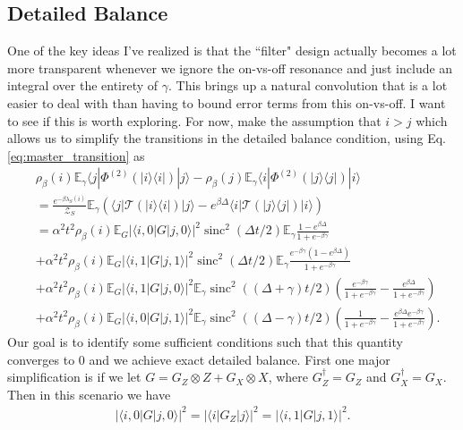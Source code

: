 \documentclass[
 amsmath,amssymb,
 aps,
onecolumn, 
nofootinbib]{revtex4-2}
\newcommand{\ket}[1]{|#1\rangle}
\newcommand{\bra}[1]{\langle #1|}
\newcommand{\ketbra}[2]{| #1\rangle\! \langle #2|}
\newcommand{\abs}[1]{\left| #1 \right|}
\newcommand{\EE}{\mathbb{E}}
\newcommand{\tp}{\otimes}
\newcommand{\partfun}{\mathcal{Z}}
\DeclareMathOperator{\sinc}{sinc}
\begin{document}
\subsection{Detailed Balance}
One of the key ideas I've realized is that the ``filter" design actually becomes a lot more transparent whenever we ignore the on-vs-off resonance and just include an integral over the entirety of $\gamma$. This brings up a natural convolution that is a lot easier to deal with than having to bound error terms from this on-vs-off. I want to see if this is worth exploring. For now, make the assumption that $i > j$ which allows us to simplify the transitions in the detailed balance condition, using Eq. \eqref{eq:master_transition} as
\begin{align}
    &\rho_{\beta}(i) \EE_\gamma \bra{j} \Phi^{(2)}(\ketbra{i}{i}) \ket{j} - \rho_{\beta}(j)\EE_\gamma \bra{i} \Phi^{(2)}(\ketbra{j}{j}) \ket{i} \nonumber \\
    &= \frac{e^{- \beta \lambda_S(i)}}{\partfun_S} \EE_\gamma  \left( \bra{j}\mathcal{T}(\ketbra{i}{i})\ket{j} - e^{\beta \Delta} \bra{i} \mathcal{T}(\ketbra{j}{j}) \ket{i} \right) \\
    &= \alpha^2 t^2 \rho_{\beta}(i) \EE_G \abs{\bra{i, 0} G \ket{j, 0}}^2 \sinc^2(\Delta t/2) \EE_\gamma  \frac{1 - e^{\beta \Delta}}{1 + e^{-\beta \gamma}} \\
    &+ \alpha^2 t^2 \rho_{\beta}(i)\EE_G  \abs{\bra{i, 1} G \ket{j, 1}}^2 \sinc^2(\Delta t/2) \EE_\gamma  \frac{e^{-\beta \gamma}(1 - e^{\beta \Delta})}{1 + e^{-\beta \gamma}} \\
    &+ \alpha^2 t^2 \rho_{\beta}(i) \EE_G  \abs{\bra{i, 1} G \ket{j, 0}}^2 \EE_\gamma \sinc^2((\Delta + \gamma) t /2) \left(\frac{e^{-\beta \gamma}}{ 1 + e^{-\beta \gamma}} - \frac{e^{\beta \Delta}}{1 + e^{-\beta \gamma}} \right) \\
    &+\alpha^2 t^2 \rho_{\beta}(i) \EE_G  \abs{\bra{i, 0} G \ket{j, 1}}^2 \EE_\gamma \sinc^2((\Delta - \gamma) t /2) \left(\frac{1}{ 1 + e^{-\beta \gamma}} - \frac{e^{\beta \Delta} e^{-\beta \gamma}}{1 + e^{-\beta \gamma}} \right).
\end{align}
Our goal is to identify some sufficient conditions such that this quantity converges to 0 and we achieve exact detailed balance. First one major simplification is if we let $G = G_Z \tp Z + G_X \tp X$, where $G_Z^\dagger = G_Z$ and $G_X^\dagger = G_X$. Then in this scenario we have
\begin{align}
    \abs{\bra{i, 0} G \ket{j, 0}}^2 = \abs{\bra{i}G_Z\ket{j}}^2 = \abs{\bra{i, 1}G\ket{j,1}}^2.
\end{align}
\end{document}
